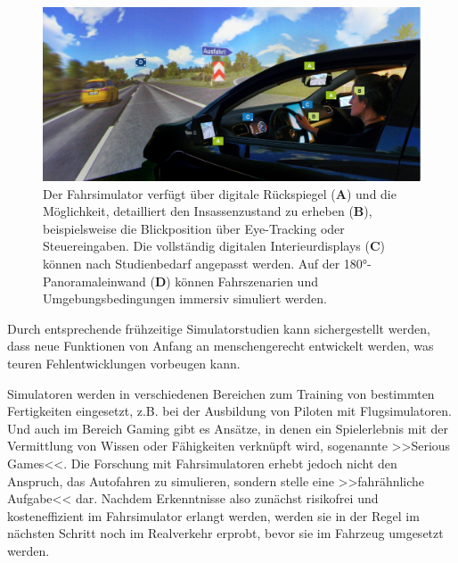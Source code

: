 \begin{figure}[t]%
\begin{nomargin} %
\vspace{-\texttopoffset} %
\includegraphics[width=\columnwidth]{content/caudri/images/ifab-sim1a}%
\end{nomargin} %
\caption{Der Fahrsimulator verfügt über digitale Rückspiegel (\textbf{A}) und die Möglichkeit, detailliert den Insassenzustand zu erheben (\textbf{B}), beispielsweise die Blickposition über Eye-Tracking oder Steuereingaben. Die vollständig digitalen Interieurdisplays (\textbf{C}) können nach Studienbedarf angepasst werden. Auf der 180°-Panoramaleinwand (\textbf{D}) können Fahrszenarien und Umgebungsbedingungen immersiv simuliert werden.}%
%
\end{figure}

\newpage




Durch entsprechende frühzeitige Simulatorstudien kann sichergestellt werden, dass neue Funktionen von Anfang an menschengerecht entwickelt werden, was teuren Fehlentwicklungen vorbeugen kann. 



Simulatoren werden in verschiedenen Bereichen zum Training von bestimmten Fertigkeiten eingesetzt, z.B. bei der Ausbildung von Piloten mit Flugsimulatoren. Und auch im Bereich Gaming gibt es Ansätze, in denen ein Spielerlebnis mit der Vermittlung von Wissen oder Fähigkeiten verknüpft wird, sogenannte >>Serious Games<<. Die Forschung mit Fahrsimulatoren erhebt jedoch nicht den Anspruch, das Autofahren zu simulieren, sondern stelle eine >>fahrähnliche Aufgabe<< dar. Nachdem Erkenntnisse also zunächst risikofrei und kosteneffizient im Fahrsimulator erlangt werden, werden sie in der Regel im nächsten Schritt noch im Realverkehr erprobt, bevor sie im Fahrzeug umgesetzt werden.



